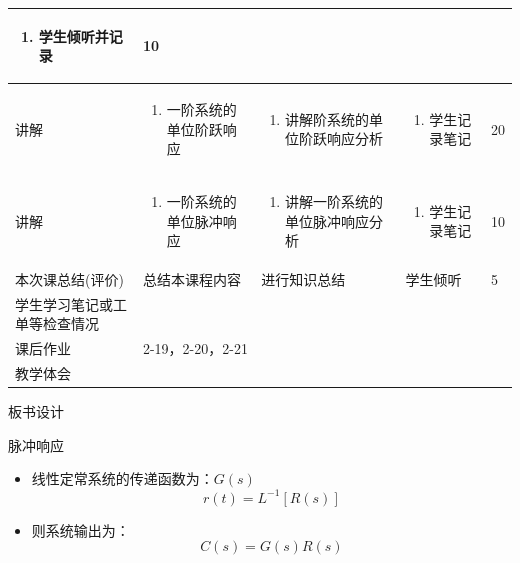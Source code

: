 {\begin{landscape}
\begin{longtable}{|m{10mm}|m{50mm}|m{50mm}|m{50mm}|m{15mm}|}
\begin{enumerate}
\item 学生倾听并记录
\end{enumerate} &10 \\\hline
讲解&\begin{enumerate}
\item 一阶系统的单位阶跃响应
\end{enumerate}
 &\begin{enumerate}
\item 讲解阶系统的单位阶跃响应分析
\end{enumerate} &\begin{enumerate}
\item 学生记录笔记
\end{enumerate} &20 \\\hline
讲解&
\begin{enumerate}
\item 一阶系统的单位脉冲响应
\end{enumerate}
 &\begin{enumerate}
\item 讲解一阶系统的单位脉冲响应分析
\end{enumerate} &\begin{enumerate}
\item 学生记录笔记
\end{enumerate} &10 \\\hline
\centering 本次课总结(评价)&总结本课程内容 &进行知识总结 &学生倾听 &5 \\\hline
\centering 学生学习笔记或工单等检查情况&\multicolumn{4}{m{165mm}|}{\quad}\\\hline
\centering 课后作业&\multicolumn{4}{m{165mm}|}{2-19，2-20，2-21}\\\hline
\centering 教学体会&\multicolumn{4}{m{165mm}|}{\quad}\\
\end{longtable}

\end{landscape}
\clearpage
\begin{center}
{\huge 板书设计}
\end{center}
}
 \begin{frame}{脉冲响应}
 \begin{block}{}
 \begin{itemize}
 \item<+-> 线性定常系统的传递函数为：$G(s)$
 \[r(t)=L^{-1}[R(s)]\]
 \item<+-> 则系统输出为：
 \[C(s)=G(s)R(s)\]
 \end{itemize}
 \end{block}
 \end{frame}
 
